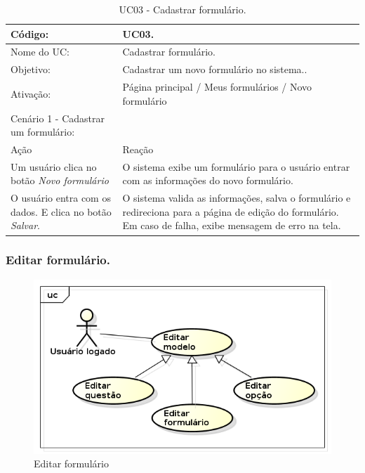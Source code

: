 \documentclass[11pt]{article}
\begin{document}
        \begin{table}[h]
          \begin{center}
            \begin{tabular}{ | p{7cm} | p{8cm} | }
              \hline
              Código: \cellcolor{gray} & UC03. \\
              \hline
              Nome do UC: \cellcolor{gray} & Cadastrar formulário. \\
              \hline
              Objetivo: \cellcolor{gray} & Cadastrar um novo formulário no sistema.. \\
              \hline
              Ativação: \cellcolor{gray} & Página principal / Meus formulários / Novo formulário \\
              \hline
              \hline
              Cenário 1 - Cadastrar um formulário: &  \\
              \hline
              Ação\cellcolor{gray} & Reação\cellcolor{gray} \\
              \hline
              Um usuário clica no botão {\em Novo formulário} & O sistema exibe um formulário para o usuário entrar com as informações do novo formulário. \\
              \hline
              O usuário entra com os dados. E clica no botão {\em Salvar}. & O sistema valida as informações, salva o formulário e redireciona para a página de edição do formulário. Em caso de falha, exibe mensagem de erro na tela. \\
              \hline
            \end{tabular}
            \caption{UC03 - Cadastrar formulário.}
          \end{center}
        \end{table}

    \clearpage
      
      \subsubsection{Editar formulário.}

        \begin{figure}[h!]
          \centering
          \includegraphics[width=.5\textwidth]{editar.png}
          \caption{Editar formulário}
        \end{figure}
\end{document}
